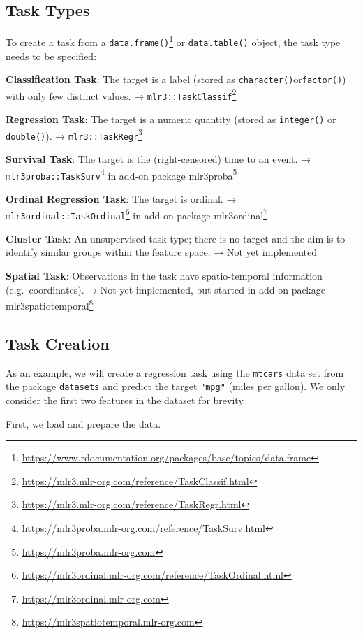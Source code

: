 \documentclass[12pt,]{scrbook}
\renewcommand{\href}[2]{#2\footnote{\url{#1}}}
\begin{document}
\hypertarget{tasks-types}{%
\subsection{Task Types}\label{tasks-types}}

To create a task from a \href{https://www.rdocumentation.org/packages/base/topics/data.frame}{\texttt{data.frame()}} or \texttt{data.table()} object, the task type needs to be specified:

\textbf{Classification Task}: The target is a label (stored as \texttt{character()}or\texttt{factor()}) with only few distinct values.
→ \href{https://mlr3.mlr-org.com/reference/TaskClassif.html}{\texttt{mlr3::TaskClassif}}

\textbf{Regression Task}: The target is a numeric quantity (stored as \texttt{integer()} or \texttt{double()}).
→ \href{https://mlr3.mlr-org.com/reference/TaskRegr.html}{\texttt{mlr3::TaskRegr}}

\textbf{Survival Task}: The target is the (right-censored) time to an event.
→ \href{https://mlr3proba.mlr-org.com/reference/TaskSurv.html}{\texttt{mlr3proba::TaskSurv}} in add-on package \href{https://mlr3proba.mlr-org.com}{mlr3proba}

\textbf{Ordinal Regression Task}: The target is ordinal.
→ \href{https://mlr3ordinal.mlr-org.com/reference/TaskOrdinal.html}{\texttt{mlr3ordinal::TaskOrdinal}} in add-on package \href{https://mlr3ordinal.mlr-org.com}{mlr3ordinal}

\textbf{Cluster Task}: An unsupervised task type; there is no target and the aim is to identify similar groups within the feature space.
→ Not yet implemented

\textbf{Spatial Task}: Observations in the task have spatio-temporal information (e.g.~coordinates).
→ Not yet implemented, but started in add-on package \href{https://mlr3spatiotemporal.mlr-org.com}{mlr3spatiotemporal}

\hypertarget{tasks-creation}{%
\subsection{Task Creation}\label{tasks-creation}}

As an example, we will create a regression task using the \texttt{mtcars} data set from the package \texttt{datasets} and predict the target \texttt{"mpg"} (miles per gallon).
We only consider the first two features in the dataset for brevity.

First, we load and prepare the data.
\end{document}
